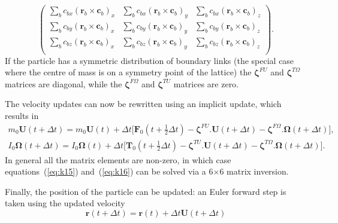 \begin{equation}
\label{eq:k14}
\left( \begin{array}{rrr}
\sum_b c_{bx} (\mathbf{r}_b \times \mathbf{c}_b)_x &
\sum_b c_{bx} (\mathbf{r}_b \times \mathbf{c}_b)_y &
\sum_b c_{bx} (\mathbf{r}_b \times \mathbf{c}_b)_z \\

\sum_b c_{by} (\mathbf{r}_b \times \mathbf{c}_b)_x &
\sum_b c_{by} (\mathbf{r}_b \times \mathbf{c}_b)_y &
\sum_b c_{by} (\mathbf{r}_b \times \mathbf{c}_b)_z \\

\sum_b c_{bz} (\mathbf{r}_b \times \mathbf{c}_b)_x &
\sum_b c_{bz} (\mathbf{r}_b \times \mathbf{c}_b)_y &
\sum_b c_{bz} (\mathbf{r}_b \times \mathbf{c}_b)_z \\

\end{array} \right).
\end{equation}
If the particle has a symmetric distribution of boundary links (the
special case where the centre of mass is on a symmetry point of the
lattice) the $\boldsymbol{\zeta}^{FU}$ and
$\boldsymbol{\zeta}^{T\Omega}$ matrices are
diagonal, while the $\boldsymbol{\zeta}^{F\Omega}$
and $\boldsymbol{\zeta}^{TU}$ matrices are zero.

The velocity updates can now be rewritten using an
implicit update, which results in
\begin{eqnarray}
\label{eq:k15}
m_0 \mathbf{U}(t + \Delta t) = m_0 \mathbf{U}(t) + \Delta t
\big[ \mathbf{F}_0 (t + {\scriptstyle\frac{1}{2}}\Delta t)
- \boldsymbol{\zeta}^{FU} . \mathbf{U}(t + \Delta t)
- \boldsymbol{\zeta}^{F\Omega}.\mathbf{\Omega}(t + \Delta t) \big],
\\
\label{eq:k16}
I_0 \mathbf{\Omega} (t + \Delta t) = I_0 \mathbf{\Omega}(t) + \Delta t
\big[ \mathbf{T}_0(t + {\scriptstyle\frac{1}{2}} \Delta t)
- \boldsymbol{\zeta}^{TU} . \mathbf{U}(t + \Delta t)
- \boldsymbol{\zeta}^{T\Omega}. \mathbf{\Omega}(t + \Delta t) \big].
\end{eqnarray}
In general all the matrix elements are non-zero, in which case
equations~(\ref{eq:k15}) and~(\ref{eq:k16}) can be solved via a
6$\times$6 matrix inversion.

Finally, the position of the particle can be updated: an Euler
forward step is taken using the updated velocity
\begin{equation}
\mathbf{r} (t + \Delta t) = \mathbf{r} (t) + \Delta t\mathbf{U}(t + \Delta t)
\end{equation}


